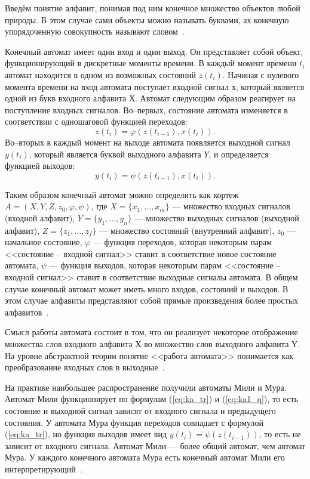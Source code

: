 Введём понятие алфавит, понимая под ним конечное множество объектов любой природы. В этом случае сами объекты можно называть буквами, ах конечную упорядоченную совокупность называют словом~\cite{ak_det}.

Конечный автомат имеет один вход и один выход. Он представляет собой объект, функционирующий в дискретные моменты времени. В каждый момент времени $t_i$ автомат находится в одном из возможных состояний $z(t_i)$. Начиная с нулевого момента времени на вход автомата поступает входной сигнал $х$, который является одной из букв входного алфавита $Х$.
Автомат следующим образом реагирует на поступление входных сигналов. Во--первых, состояние автомата изменяется в соответствии с одношаговой функцией переходов:
\begin{equation}
	\label{eq:ka_tr}
	z(t_i) = \varphi(z(t_{i-1}), x(t_i)).
\end{equation}
Во--вторых в каждый момент на выходе автомата появляется выходной сигнал $y(t_i)$, который является буквой выходного алфавита $Y$, и определяется функцией выходов:
\begin{equation}
	\label{eq:ka1_q}
	y(t_i) = \psi(z(t_{i-1}), x(t_i)).
\end{equation}

Таким образом конечный автомат можно определить как кортеж $A = (X, Y, Z, z_0, \varphi, \psi)$, где $X=\{x_1, ..., x_m\}$ --- множество входных сигналов (входной алфавит),  $Y=\{y_1, ..., y_n\}$ --- множество выходных сигналов (выходной алфавит), $Z=\{z_1, ..., z_f\}$ --- множество состояний (внутренний алфавит), $z_0$ --- начальное состояние, $\varphi$ --- функция переходов, которая некоторым парам <<состояние -- входной сигнал>> ставит в соответствие  новое состояние автомата, $\psi$ --- функция выходов, которая некоторым парам <<состояние -- входной сигнал>> ставит в соответствие выходные сигналы автомата. В общем случае конечный автомат может иметь много входов, состояний и выходов. В этом случае алфавиты представляют собой прямые произведения более простых алфавитов~\cite{ak_det}.

Смысл работы автомата состоит в том, что он реализует некоторое отображение множества слов входного алфавита $Х$ во множество слов выходного алфавита $Ү$. На уровне абстрактной теории понятие <<работа автомата>> понимается как преобразование входных слов в выходные~\cite{ak_det}. 

На практике наибольшее распространение получили автоматы Мили и Мура. Автомат Мили функционирует по формулам (\ref{eq:ka_tr}) и (\ref{eq:ka1_q}), то есть состояние и выходной сигнал зависят от входного сигнала и предыдущего состояния. У автомата Мура функция переходов  совпадает с формулой (\ref{eq:ka_tr}), но функция выходов имеет вид $y(t_i) = \psi(z(t_{i-1}))$, то есть не зависит от входного сигнала. Автомат Мили --- более общий автомат, чем автомат Мура. У каждого конечного автомата Мура есть конечный автомат Мили его интерпретирующий~\cite{ak_types}.

